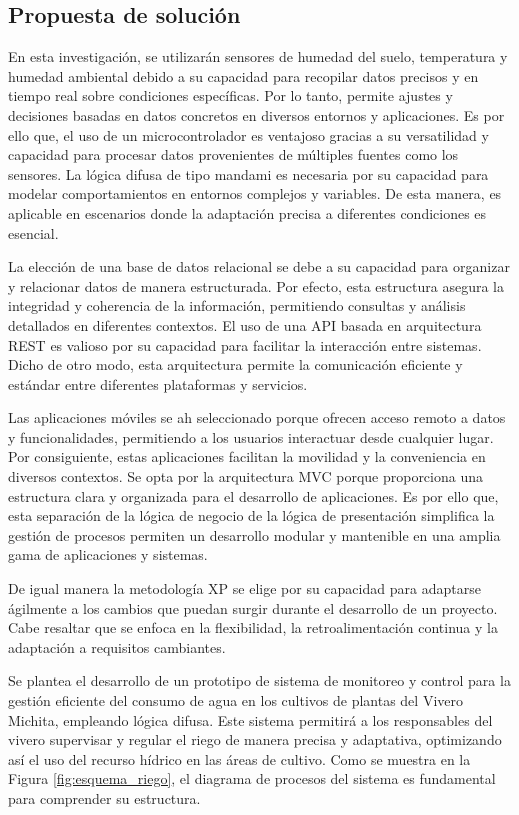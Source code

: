 \subsection{Propuesta de solución}
\newpage


\bigbreak
En esta investigación, se utilizarán sensores de humedad del suelo, temperatura y humedad ambiental debido a su capacidad para recopilar datos precisos y en tiempo real sobre condiciones específicas. Por lo tanto, permite ajustes y decisiones basadas en datos concretos en diversos entornos y aplicaciones. Es por ello que, el uso de un microcontrolador es ventajoso gracias a su versatilidad y capacidad para procesar datos provenientes de múltiples fuentes como los sensores. La lógica difusa de tipo mandami es necesaria por su capacidad para modelar comportamientos en entornos complejos y variables. De esta manera, es aplicable en escenarios donde la adaptación precisa a diferentes condiciones es esencial.

\bigbreak
La elección de una base de datos relacional se debe a su capacidad para organizar y relacionar datos de manera estructurada. Por efecto, esta estructura asegura la integridad y coherencia de la información, permitiendo consultas y análisis detallados en diferentes contextos. El uso de una API basada en arquitectura REST es valioso por su capacidad para facilitar la interacción entre sistemas. Dicho de otro modo, esta arquitectura permite la comunicación eficiente y estándar entre diferentes plataformas y servicios.

\bigbreak
Las aplicaciones móviles se ah seleccionado porque ofrecen acceso remoto a datos y funcionalidades, permitiendo a los usuarios interactuar desde cualquier lugar. Por consiguiente, estas aplicaciones facilitan la movilidad y la conveniencia en diversos contextos. Se opta por la arquitectura MVC porque proporciona una estructura clara y organizada para el desarrollo de aplicaciones. Es por ello que, esta separación de la lógica de negocio de la lógica de presentación simplifica la gestión de procesos permiten un desarrollo modular y mantenible en una amplia gama de aplicaciones y sistemas.

\bigbreak
De igual manera la metodología XP se elige por su capacidad para adaptarse ágilmente a los cambios que puedan surgir durante el desarrollo de un proyecto. Cabe resaltar que se enfoca en la flexibilidad, la retroalimentación continua y la adaptación a requisitos cambiantes.

\bigbreak
Se plantea el desarrollo de un prototipo de sistema de monitoreo y control para la gestión eficiente del consumo de agua en los cultivos de plantas del Vivero Michita, empleando lógica difusa. Este sistema permitirá a los responsables del vivero supervisar y regular el riego de manera precisa y adaptativa, optimizando así el uso del recurso hídrico en las áreas de cultivo. Como se muestra en la Figura \ref{fig:esquema_riego}, el diagrama de procesos del sistema es fundamental para comprender su estructura.

